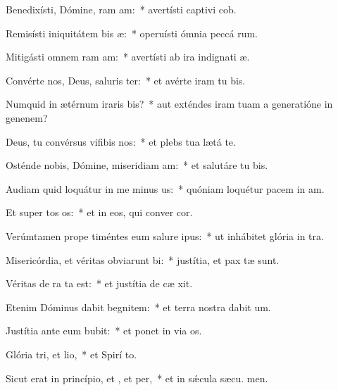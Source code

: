 \item Benedixísti, Dómine, ram am:~* avertísti captivi cob.
\item Remisísti iniquitátem bis æ:~* operuísti ómnia peccá rum.
\item Mitigásti omnem ram am:~* avertísti ab ira indignati æ.
\item Convérte nos, Deus, saluris ter:~* et avérte iram tu  bis.
\item Numquid in ætérnum iraris bis?~* aut exténdes iram tuam a generatióne in genenem?
\item Deus, tu convérsus vifibis nos:~* et plebs tua lætá  te.
\item Osténde nobis, Dómine, miseridiam am:~* et salutáre tu  bis.
\item Audiam quid loquátur in me minus us:~* quóniam loquétur pacem in  am.
\item Et super tos os:~* et in eos, qui conver  cor.
\item Verúmtamen prope timéntes eum salure ipus:~* ut inhábitet glória in  tra.
\item Misericórdia, et véritas obviarunt bi:~* justítia, et pax tæ sunt.
\item Véritas de ra ta est:~* et justítia de cæ xit.
\item Etenim Dóminus dabit begnitem:~* et terra nostra dabit  um.
\item Justítia ante eum bubit:~* et ponet in via  os.
\item Glória tri, et lio,~* et Spirí to.
\item Sicut erat in princípio, et , et per,~* et in sǽcula sæcu. men.
